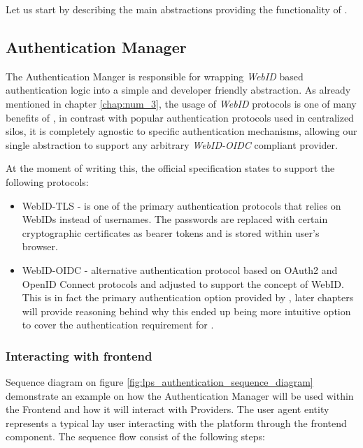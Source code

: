 Let us start by describing the main abstractions providing the functionality of \lpas{}.

\subsection{Authentication Manager}

The Authentication Manger is responsible for wrapping \solid{} \textit{WebID} based authentication logic into a simple and developer friendly abstraction. As already mentioned in chapter \ref{chap:num_3}, the usage of \textit{WebID} protocols is one of many benefits of \solid{}, in contrast with popular authentication protocols used in centralized silos, it is completely agnostic to specific authentication mechanisms, allowing our single abstraction to support any arbitrary \textit{WebID-OIDC} compliant \solid{} provider.

At the moment of writing this, the official \solid{} specification states to support the following protocols:
\begin{itemize}
\item WebID-TLS  - is one of the primary authentication protocols that relies on WebIDs instead of usernames. The passwords are replaced with certain cryptographic certificates as bearer tokens and is stored within user's browser.
\item WebID-OIDC - alternative authentication protocol based on OAuth2 and OpenID Connect protocols and adjusted to support the concept of WebID. This is in fact the primary authentication option provided by \lpas{}, later chapters will provide reasoning behind why this ended up being more intuitive option to cover the authentication requirement for \lpa{}.   
\end{itemize}

\subsubsection{Interacting with frontend}

Sequence diagram on figure \ref{fig:lps_authentication_sequence_diagram} demonstrate an example on how the Authentication Manager will be used within the \lpa{} Frontend and how it will interact with \solid{} Providers. The user agent entity represents a typical lay \lpa{} user interacting with the platform through the frontend component. The sequence flow consist of the following steps:

